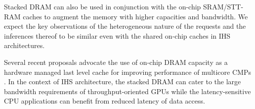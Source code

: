 \par Stacked DRAM can also be used in conjunction with the on-chip SRAM/STT-RAM caches to augment the memory with higher capacities and bandwidth. We expect the key observations of the heterogeneous nature of the requests and the inferences thereof to be similar even with the shared on-chip caches in IHS architectures.
\par Several recent proposals advocate the use of on-chip DRAM capacity as a hardware managed last level cache for improving performance of multicore CMPs \cite{alloy,bimodal,loh-hill,atcache}. In the context of IHS architecture, the stacked DRAM can cater to the large bandwidth requirements of throughput-oriented GPUs while the latency-sensitive CPU applications can benefit from reduced latency of data access. 

\begin{comment}
\begin{figure}[!htb]
	\centering
	\def\svgwidth{0.5\columnwidth}
	
	\caption{Proposed DRAM Stacking for IHS}
	\label{fig:stackdram}
\end{figure}
\end{comment}

